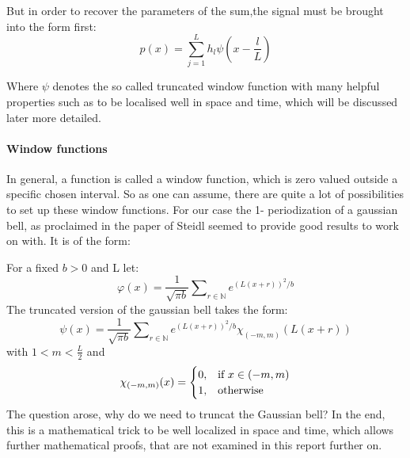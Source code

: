 \documentclass{article}
\begin{document}
But in order to recover the parameters of the sum,the signal must be brought into the form first:  
\begin{equation}\label{eqn:truncatedw}
 p(x)=\sum\limits_{j=1}^L h_{l}\psi(x-\frac{l}{L})
\end{equation}

Where $\psi$ denotes the so called truncated window function with many helpful properties such as to be localised well in space and time, which will be discussed later more detailed. \\

\paragraph{Window functions	} $ $\\[1ex]
In general, a function is called a window function, which is zero valued outside a specific chosen interval.
So as one can assume, there are quite a lot of possibilities to set up these window functions.
For our case the 1- periodization of a gaussian bell, as proclaimed in the paper of Steidl seemed to provide good results to work on with.
It is of the form: 

For a fixed $b>0$ and L let:
\begin{equation}
\varphi(x)= \frac{1}{\sqrt{\pi b}} \sum\nolimits_{r \in \mathbb{N}}  e^{(L(x+r))^2/b}
\end{equation}
The truncated version of the gaussian bell takes the form: 
\begin{equation}
\psi(x)= \frac{1}{\sqrt{\pi b}} \sum\nolimits_{r \in \mathbb{N}}  e^{(L(x+r))^2/b}\chi_{(-m,m)}(L(x+r))
\end{equation}
with $1<m < \frac{L}{2}$ and
\begin{equation}
    \chi_{(-m,m)}(x)=
    \begin{cases}
      0, & \text{if}\ x\in (-m,m) \\
      1, & \text{otherwise}
    \end{cases}\notag
\end{equation} 
The question arose, why do we need to truncat the Gaussian bell? In the end, this is a mathematical trick to be well localized in space and time, which allows further mathematical proofs, that are not examined in this report further on.
\end{document}

